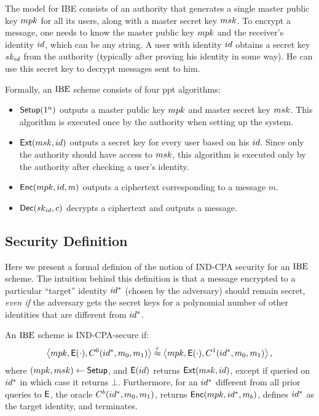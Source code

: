 \documentclass[11pt]{article}
\begin{document}
The model for IBE consists of an authority that generates a single
master public key $mpk$ for all its users, along with a master secret
key $msk$.  To encrypt a message, one needs to know the master public
key $mpk$ and the receiver's identity $id$, which can be any string.
A user with identity $id$ obtains a secret key $sk_{id}$ from the
authority (typically after proving his identity in some way).  He can
use this secret key to decrypt messages sent to him.

Formally, an $\text{IBE}$ scheme consists of four ppt algorithms:
\begin{itemize}
\item $\mathsf{Setup}(1^{n})$ outputs a master public key $mpk$ and master
  secret key $msk$.  This algorithm is executed once by the authority
  when setting up the system.
\item $\mathsf{Ext}(msk, id)$ outputs a secret key for every user based
  on his $id$.  Since only the authority should have access to
  $msk$, this algorithm is executed only by the authority after
  checking a user's identity.
\item $\mathsf{Enc}(mpk, id, m)$ outputs a ciphertext corresponding to a
  message $m$.
\item $\mathsf{Dec}(sk_{id}, c)$ decrypts a ciphertext and outputs a
  message.
\end{itemize}

\subsection{Security Definition}
\label{sec:security-definition}

Here we present a formal definion of the notion of IND-CPA security
for an $\text{IBE}$ scheme.  The intuition behind this definition is that a
message encrypted to a particular ``target'' identity $id^*$ (chosen
by the adversary) should remain secret, \emph{even if} the adversary
gets the secret keys for a polynomial number of other identities that
are different from $id^*$.

\begin{definition}
  \label{def:ibe-ind-cpa}
  An $\text{IBE}$ scheme is IND-CPA-secure if:
  \[\left\langle mpk, \mathsf{E}(\cdot),
    C^0(id^*,m_0,m_1)\right\rangle \stackrel{c}{\approx} \left\langle mpk,
    \mathsf{E}(\cdot), C^1(id^*,m_0,m_1)\right\rangle,\] where $(mpk,
  msk) \gets \mathsf{Setup}$, and $\mathsf{E}(id)$ returns
  $\mathsf{Ext}(msk,id)$, except if queried on $id^*$ in which case it
  returns $\bot$.  Furthermore, for an $id^{*}$ different from all
  prior queries to $\mathsf{E}$, the oracle $C^b(id^*,m_0,m_1)$,
  returns $\mathsf{Enc}(mpk,id^{*},m_b)$, defines $id^{*}$ as the target
  identity, and terminates.
\end{definition}
\end{document}
